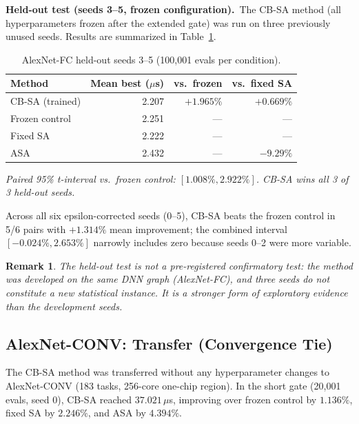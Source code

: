 \documentclass[10pt,conference]{IEEEtran}
\newtheorem{remark}{Remark}
\begin{document}
\textbf{Held-out test (seeds 3--5, frozen configuration).}\
The CB-SA method (all hyperparameters frozen after the extended gate) was run on
three previously unused seeds.  Results are summarized in
Table~\ref{tab:alexnet-fc-holdout}.

\begin{table}[htbp]
  \caption{AlexNet-FC held-out seeds 3--5 (100,001 evals per condition).}
  \label{tab:alexnet-fc-holdout}
  \centering
  \begin{tabular}{lrrr}
    \toprule
    Method & Mean best ($\mu$s) & vs.\ frozen & vs.\ fixed SA \\
    \midrule
    CB-SA (trained)      & 2.207 & $+1.965\%$ & $+0.669\%$ \\
    Frozen control       & 2.251 & --- & --- \\
    Fixed SA             & 2.222 & --- & --- \\
    ASA                  & 2.432 & --- & $-9.29\%$ \\
    \bottomrule
  \end{tabular}
  \vspace{0.5ex}
  \small{\textit{Paired 95\% t-interval vs.\ frozen control:
  $[1.008\%, 2.922\%]$.  CB-SA wins all 3 of 3 held-out seeds.}}
\end{table}

Across all six epsilon-corrected seeds (0--5), CB-SA beats the frozen control
in 5/6 pairs with $+1.314\%$ mean improvement; the combined interval
$[-0.024\%, 2.653\%]$ narrowly includes zero because seeds 0--2 were more
variable.

\begin{remark}
  The held-out test is not a pre-registered confirmatory test: the method was
  developed on the same DNN graph (AlexNet-FC), and three seeds do not
  constitute a new statistical instance.  It is a stronger form of exploratory
  evidence than the development seeds.
\end{remark}

\subsection{AlexNet-CONV: Transfer (Convergence Tie)}

The CB-SA method was transferred without any hyperparameter changes to
AlexNet-CONV (183 tasks, 256-core one-chip region).  In the short gate (20,001
evals, seed 0), CB-SA reached $37.021\,\mu$s, improving over frozen control
by $1.136\%$, fixed SA by $2.246\%$, and ASA by $4.394\%$.
\end{document}
